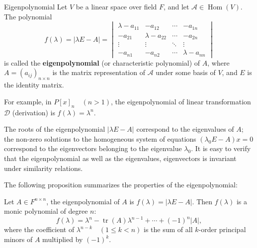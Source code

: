 \documentclass[11pt]{../../TexTemplate/elegantbook} %
\begin{document}
\begin{definition}{Eigenpolynomial}
    Let \( V \) be a linear space over field \( F \), 
    and let \( \mathcal{A}\in \operatorname{Hom}(V) \).
    The polynomial
    \[
    f(\lambda) = |\lambda E - A| = \begin{vmatrix}
        \lambda - a_{11} & -a_{12} & \cdots & -a_{1n} \\
        -a_{21} & \lambda - a_{22} & \cdots & -a_{2n} \\
        \vdots & \vdots & \ddots & \vdots \\
        -a_{n1} & -a_{n2} & \cdots & \lambda - a_{nn}
    \end{vmatrix}
    \]
    is called the \textbf{eigenpolynomial} (or characteristic polynomial) of \( A \),
    where \( A = (a_{ij})_{n\times n} \) is the matrix representation of \( \mathcal{A} \)
    under some basis of \( V \), and \( E \) is the identity matrix.
\end{definition}

\begin{remark}
    For example, in \(P[x]_{n}\quad (n>1)\), the eigenpolynomial of linear transformation \( \mathcal{D} \) (derivation)
    is \( f(\lambda) = \lambda^n \).
\end{remark}

The roots of the eigenpolynomial $\lvert \lambda E-A \rvert$ correspond to the eigenvalues of $A$; 
the non-zero solutions to the homogeneous system of equations $(\lambda_{0}E-A)x=0$ 
correspond to the eigenvectors belonging to the eigenvalue $\lambda_{0}$.
It is easy to verify that the eigenpolynomial as well as the eigenvalues, eigenvectors is invariant under similarity relations.

\vspace{0.7cm}
The following proposition summarizes the properties of the eigenpolynomial:
\begin{proposition}
    Let \( A \in F^{n \times n} \), the eigenpolynomial of \( A \) is \( f(\lambda) = |\lambda E - A| \).
    Then \( f(\lambda) \) is a monic polynomial of degree \( n \):
    \[
    f(\lambda) = \lambda^n - \operatorname{tr}(A)\lambda^{n-1} + \cdots + (-1)^n |A|,
    \]
    where the coefficient of \( \lambda^{n-k}\quad(1 \leqslant k < n) \) is 
    the sum of all \( k \)-order principal minors of \( A \) multiplied by \( (-1)^k \).  
\end{proposition}
\end{document}
